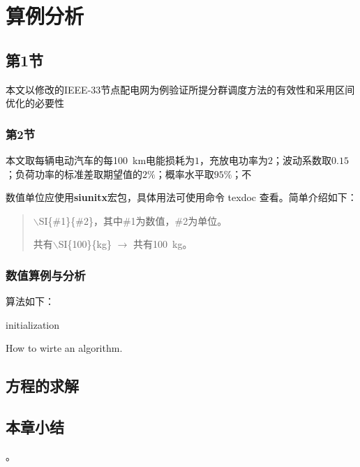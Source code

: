 
\chapter{算例分析}
\section{第1节}
本文以修改的IEEE-33节点配电网为例验证所提分群调度方法的有效性和采用区间优化的必要性
\subsection{第2节}
本文取每辆电动汽车的每\SI{100}{km}电能损耗为$1$，充放电功率为$2$；波动系数取$0.15$；负荷功率的标准差取期望值的$2\%$；概率水平取$95\%$；不

数值单位应使用\textbf{siunitx}宏包，具体用法可使用命令 texdoc 查看。简单介绍如下：
\begin{quote}
$\backslash$SI\{\#1\}\{\#2\}，其中\#1为数值，\#2为单位。

共有$\backslash$SI\{100\}\{kg\} $\rightarrow$ 共有\SI{100}{kg}。
\end{quote}

\subsection{数值算例与分析}
算法如下：

\begin{algorithm}[H]
 initialization\;
 \caption{How to wirte an algorithm.}
\end{algorithm}


\section{方程的求解}

\section{本章小结}
。